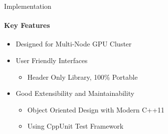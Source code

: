 \documentclass[final]{beamer}
\newlength{\sepwid}
\newlength{\onecolwid}
\begin{document}
\begin{frame}[t]
\begin{columns}[t]
      \begin{column}{\sepwid}\end{column}

      \begin{column}{\onecolwid}
      \end{column}
      
      \begin{column}{\sepwid}\end{column}
      
      \begin{column}{\onecolwid}
        \begin{block}{Implementation}
          \paragraph{\textbf{Key Features}}
            \begin{itemize}
              \item Designed for Multi-Node GPU Cluster
              \item User Friendly Interfaces
              \begin{itemize}
                \item Header Only Library, 100\% Portable
              \end{itemize}
              \item Good Extensibility and Maintainability
              \begin{itemize}
                \item Object Oriented Design with Modern C++11
                \item Using CppUnit Test Framework
              \end{itemize}
            \end{itemize}
        \end{block}


\end{column}
\end{columns}
\end{frame}
\end{document}
